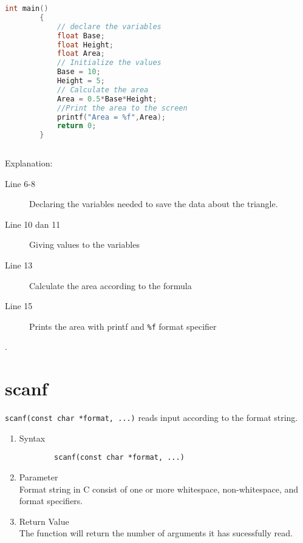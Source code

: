 \begin{description}
\begin{lstlisting}[language=c,captionpos=t]
		int main()
		{
			// declare the variables
			float Base;
			float Height;
			float Area;
			// Initialize the values
			Base = 10;
			Height = 5;
			// Calculate the area
			Area = 0.5*Base*Height;
			//Print the area to the screen
			printf("Area = %f",Area);
			return 0;
		}
		
	\end{lstlisting}
	
	Explanation:
	\begin{description}
		\item[Line 6-8] Declaring the variables needed to save the data about the triangle. %
		\item[Line 10 dan 11] Giving values to the variables %
		\item[Line 13] Calculate the area according to the formula %
		\item[Line 15] Prints the area with printf and \verb|%f| format specifier %
	\end{description}
\end{description}

.\section{scanf}
\verb*|scanf(const char *format, ...)| reads input according to the format string.

\begin{enumerate}
	\item Syntax 
	\begin{verbatim}
		scanf(const char *format, ...)
	\end{verbatim}
	\item Parameter \\
	Format string in C consist of one or more whitespace, non-whitespace, and format specifiers.
	\item Return Value \\
	The function will return the number of arguments it has sucessfully read.
	
\end{enumerate}

